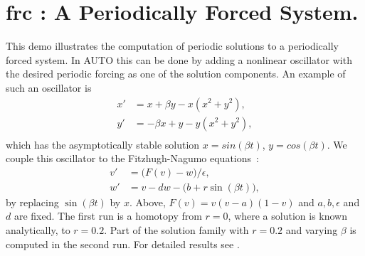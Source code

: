 \documentclass[12pt]{report}
\def\eps{\epsilon}
\begin{document}
\section{ frc : A Periodically Forced System.} \label{sec:Demos_frc}
This demo illustrates the computation of periodic solutions
to a periodically forced system.
In {\cal AUTO} this can be done by adding a nonlinear oscillator with
the desired periodic forcing as one of the solution components.
An example of such an oscillator is
\begin{equation} \begin{array}{cl}
 x'&=x + \beta y - x (x^{2} + y^{2}),  \\
 y'&=-\beta x + y - y (x^{2} + y^{2}), \\\end{array} \end{equation}
which has the asymptotically stable solution $x=sin (\beta t)$,
$y=cos (\beta t)$.
We couple this oscillator to the Fitzhugh-Nagumo equations~:
\begin{equation} \begin{array}{cl}
 v'&=\bigl( F(v) - w \bigr) / \eps,  \\
 w'&=v - dw - \bigl( b + r \sin(\beta t) \bigr) ,
\end{array} \end{equation}
by replacing $\sin(\beta t)$ by $x$.
Above, $F(v) = v (v-a) (1-v)$ and $a,b,\eps$ and $d$ are fixed.
The first run is a homotopy from $r=0$, where a solution is known analytically,
to $r=0.2$.
Part of the solution family with $r=0.2$ and varying $\beta$ 
is computed in the second run.
For detailed results see 
 \citeyear{AlDoOt:90}.
\end{document}
